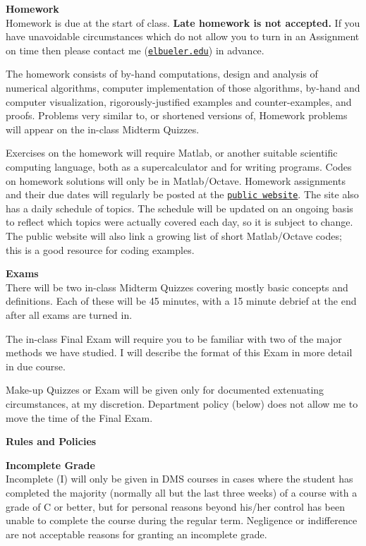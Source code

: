\documentclass[12pt]{article}
\renewcommand{\emph}[1]{\textsf{\textbf{#1}}}
\newcommand{\localhead}[1]{\par\smallskip\textbf{#1} \smallskip\nobreak\\}%
\def\heading#1{\localhead{\large\emph{#1}}}
\def\subheading#1{\localhead{\emph{#1}}}
\begin{document}
\heading{Homework}
Homework is due at the start of class.  \emph{Late homework is not accepted.}  If you have unavoidable circumstances which do not allow you to turn in an Assignment on time then please contact me (\href{mailto:elbueler@alaska.edu}{\texttt{elbueler\@@alaska.edu}}) in advance.

The homework consists of by-hand computations, design and analysis of numerical algorithms, computer implementation of those algorithms, by-hand and computer visualization, rigorously-justified examples and counter-examples, and proofs.  Problems very similar to, or shortened versions of, Homework problems will appear on the in-class Midterm Quizzes.

Exercises on the homework will require Matlab, or another suitable scientific computing language, both as a supercalculator and for writing programs.  Codes on homework solutions will only be in Matlab/Octave.  Homework assignments and their due dates will regularly be posted at the \href{https://bueler.github.io/nla/}{\texttt{public website}}.  The site also has a daily schedule of topics.  The schedule will be updated on an ongoing basis to reflect which topics were actually covered each day, so it is subject to change.  The public website will also link a growing list of short Matlab/Octave codes; this is a good resource for coding examples.


\heading{Exams}
There will be two in-class Midterm Quizzes covering mostly basic concepts and definitions.  Each of these will be 45 minutes, with a 15 minute debrief at the end after all exams are turned in.

The in-class Final Exam will require you to be familiar with two of the major methods we have studied.  I will describe the format of this Exam in more detail in due course.

Make-up Quizzes or Exam will be given only for documented extenuating circumstances, at my discretion.  Department policy (below) does not allow me to move the time of the Final Exam.


\clearpage\newpage
\phantom{foo}
\heading{Rules and Policies}
\vskip -20pt

\subheading{Incomplete Grade} 
Incomplete (I) will only be given in
  DMS courses in cases where
  the student has completed the majority (normally all but the last
  three weeks) of a course with a grade of C or better, but for
  personal reasons beyond his/her control has been unable to complete
  the course during the regular term. Negligence or indifference are
  not acceptable reasons for granting an incomplete grade.
\end{document}

